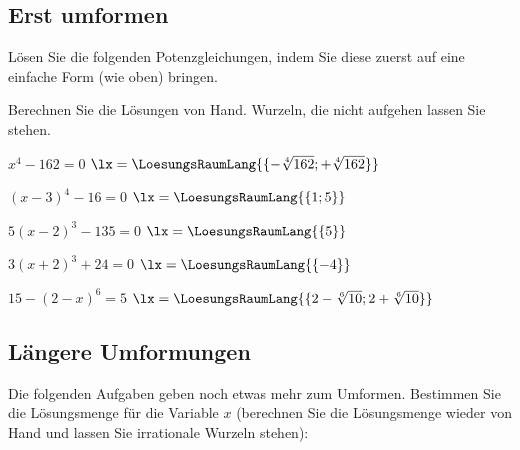 \subsection{Erst umformen}
Lösen Sie die folgenden Potenzgleichungen, indem Sie diese zuerst auf eine einfache Form (wie oben) bringen.

Berechnen Sie die Lösungen von Hand. Wurzeln, die nicht aufgehen
lassen Sie stehen.


\begin{bbwAufgabenBlock}

\item
 $x^4-162 = 0$ \hspace{10mm} $\lx=\LoesungsRaumLang{\{-\sqrt[4]{162}; +\sqrt[4]{162}\}}$

\item
 $(x-3)^4 - 16 = 0$ \hspace{10mm} $\lx=\LoesungsRaumLang{\{1; 5\}}$
 \noTRAINER{\newpage}

\item
 $5(x-2)^3 - 135 = 0$ \hspace{10mm} $\lx=\LoesungsRaumLang{\{5\}}$

\item
 $3(x+2)^3 + 24 = 0$ \hspace{10mm} $\lx=\LoesungsRaumLang{\{-4\}}$

\item
 $15-(2-x)^6 = 5$ \hspace{10mm} $\lx=\LoesungsRaumLang{\{2-\sqrt[6]{10}; 2+\sqrt[6]{10}\}}$

\end{bbwAufgabenBlock}

\noTRAINER{\newpage}

\subsection{Längere Umformungen}

Die folgenden Aufgaben geben noch etwas mehr zum Umformen. Bestimmen
Sie die Lösungsmenge für die Variable $x$ (berechnen Sie die
Lösungsmenge wieder von Hand und lassen Sie irrationale Wurzeln stehen):

